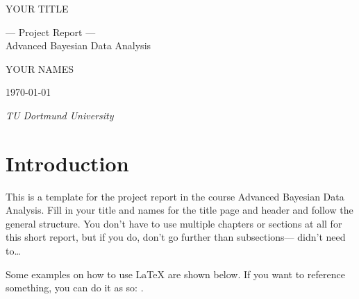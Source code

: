\documentclass[12pt]{article}
\begin{document}
\begin{titlepage}
        \centering %
        \vspace*{\baselineskip} %
        
        {\huge YOUR TITLE}\\[0.2\baselineskip] %
        
        
        \vspace*{\baselineskip}
        
        {\Large --- Project Report ---\\
          Advanced Bayesian Data Analysis\\[\baselineskip]} %
        \vspace*{\baselineskip}
        
        {\LARGE YOUR NAMES\\[\baselineskip]} %
        
        \vspace*{\baselineskip}

        \vfill
        
        \today \par %
        
        \vspace*{\baselineskip}

        {\itshape TU Dortmund University\par} %
    \end{titlepage}

\clearpage

\section{Introduction}
This is a template for the project report in the course Advanced Bayesian Data Analysis.
Fill in your title and names for the title page and header and follow the general structure. You don't have to use multiple chapters or sections at all for this short report, but if you do, don't go further than subsections--- \textcite{feynman1963lnphysics} didn't need to\ldots

Some examples on how to use \LaTeX{} are shown below. If you want to reference something, you can do it as so:
\textcite{mcelreath2016statistical}.
\end{document}
